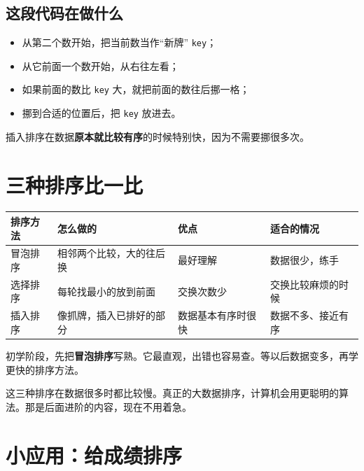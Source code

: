 \subsection{这段代码在做什么}

\begin{itemize}
  \item 从第二个数开始，把当前数当作“新牌” \texttt{key}；
  \item 从它前面一个数开始，从右往左看；
  \item 如果前面的数比 \texttt{key} 大，就把前面的数往后挪一格；
  \item 挪到合适的位置后，把 \texttt{key} 放进去。
\end{itemize}

插入排序在数据\textbf{原本就比较有序}的时候特别快，因为不需要挪很多次。

\section{三种排序比一比}

\begin{center}
\begin{tabular}{@{}p{}p{}p{}p{}@{}}
\toprule
排序方法 & 怎么做的 & 优点 & 适合的情况 \\
\midrule
冒泡排序 & 相邻两个比较，大的往后换 & 最好理解 & 数据很少，练手 \\
选择排序 & 每轮找最小的放到前面 & 交换次数少 & 交换比较麻烦的时候 \\
插入排序 & 像抓牌，插入已排好的部分 & 数据基本有序时很快 & 数据不多、接近有序 \\
\bottomrule
\end{tabular}
\end{center}

\begin{tipbox}[初学怎么选]
初学阶段，先把\textbf{冒泡排序}写熟。它最直观，出错也容易查。等以后数据变多，再学更快的排序方法。
\end{tipbox}

\begin{note}
这三种排序在数据很多时都比较慢。真正的大数据排序，计算机会用更聪明的算法。那是后面进阶的内容，现在不用着急。
\end{note}

\section{小应用：给成绩排序}

